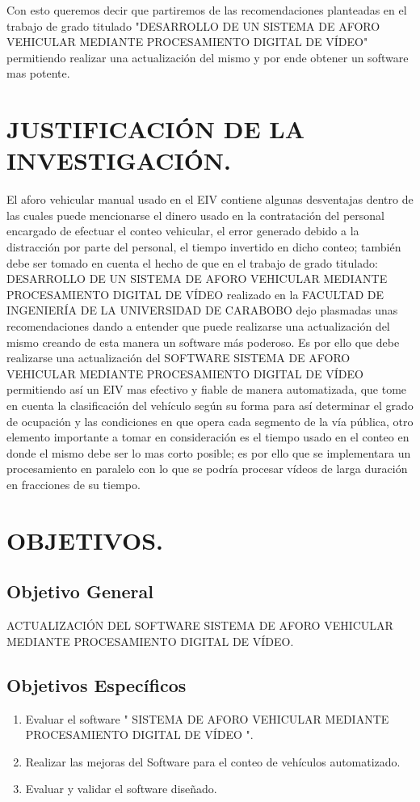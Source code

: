 Con esto queremos decir que partiremos de las recomendaciones planteadas en el trabajo de grado titulado "DESARROLLO DE UN SISTEMA DE AFORO VEHICULAR MEDIANTE PROCESAMIENTO DIGITAL DE VÍDEO" permitiendo realizar una actualización del mismo y por ende obtener un software mas potente. 
 

\section{JUSTIFICACIÓN DE LA INVESTIGACIÓN.}

El aforo vehicular manual usado en el EIV contiene algunas desventajas dentro de las cuales puede mencionarse el dinero usado en la contratación del personal encargado de efectuar el conteo vehicular, el error generado debido a la distracción por parte del personal, el tiempo invertido en dicho conteo; también debe ser tomado  en cuenta el hecho de que en el trabajo de grado titulado: DESARROLLO DE UN SISTEMA DE AFORO VEHICULAR MEDIANTE PROCESAMIENTO DIGITAL DE VÍDEO realizado en la FACULTAD DE INGENIERÍA DE LA UNIVERSIDAD DE CARABOBO dejo plasmadas unas recomendaciones dando a entender que puede realizarse una actualización del mismo creando de esta manera un software  m\'as poderoso. Es por ello que debe realizarse una actualización del SOFTWARE SISTEMA DE AFORO VEHICULAR MEDIANTE PROCESAMIENTO DIGITAL DE VÍDEO permitiendo así un EIV mas efectivo y fiable de manera automatizada, que tome en cuenta la clasificación del vehículo según su forma para así  determinar el grado de ocupación y las condiciones en que opera cada segmento de la vía p\'ublica, otro elemento importante a tomar en consideración es el tiempo usado en el conteo en donde el mismo debe ser lo mas corto posible; es por ello que se implementara un procesamiento en paralelo con lo que se podría procesar vídeos de larga duración en fracciones de su tiempo. 

\section{OBJETIVOS.}
\subsection{Objetivo General}
ACTUALIZACIÓN DEL SOFTWARE SISTEMA DE AFORO VEHICULAR MEDIANTE PROCESAMIENTO DIGITAL DE VÍDEO.
\subsection{Objetivos Específicos}
\begin{enumerate}
	\item Evaluar el software " SISTEMA DE AFORO VEHICULAR MEDIANTE PROCESAMIENTO DIGITAL DE VÍDEO ".
	\item Realizar las mejoras del Software para el conteo de vehículos automatizado.
	\item Evaluar y validar el software diseñado.
	
\end{enumerate}

